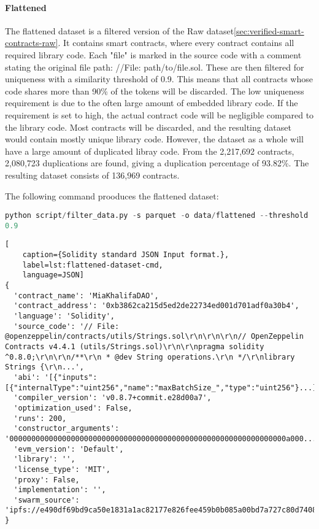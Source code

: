 
\paragraph{Flattened}
\label{sec:verified-smart-contracts-flattened}

The flattened dataset is a filtered version  of the Raw dataset\cref{sec:verified-smart-contracts-raw}. It contains smart contracts, where every contract contains all required library code. Each "file" is marked in the source code with a comment stating the original file path: //File: path/to/file.sol. These are then filtered for uniqueness with a similarity threshold of 0.9. This means that all contracts whose code shares more than 90\% of the tokens will be discarded. The low uniqueness requirement is due to the often large amount of embedded library code. If the requirement is set to high, the actual contract code will be negligible compared to the library code. Most contracts will be discarded, and the resulting dataset would contain mostly unique library code. However, the dataset as a whole will have a large amount of duplicated libray code. From the 2,217,692 contracts, 2,080,723 duplications are found, giving a duplication percentage of 93.82\%. The resulting dataset consists of 136,969 contracts.


The following command prooduces the flattened dataset:

\lstinline[language=Python]!python script/filter_data.py -s parquet -o data/flattened --threshold 0.9!


\begin{lstlisting}[
    caption={Solidity standard JSON Input format.},
    label=lst:flattened-dataset-cmd,
    language=JSON]
{
  'contract_name': 'MiaKhalifaDAO',
  'contract_address': '0xb3862ca215d5ed2de22734ed001d701adf0a30b4',
  'language': 'Solidity',
  'source_code': '// File: @openzeppelin/contracts/utils/Strings.sol\r\n\r\n\r\n// OpenZeppelin Contracts v4.4.1 (utils/Strings.sol)\r\n\r\npragma solidity ^0.8.0;\r\n\r\n/**\r\n * @dev String operations.\r\n */\r\nlibrary Strings {\r\n...',
  'abi': '[{"inputs":[{"internalType":"uint256","name":"maxBatchSize_","type":"uint256"}...]',
  'compiler_version': 'v0.8.7+commit.e28d00a7',
  'optimization_used': False,
  'runs': 200,
  'constructor_arguments': '000000000000000000000000000000000000000000000000000000000000000a000...',
  'evm_version': 'Default',
  'library': '',
  'license_type': 'MIT',
  'proxy': False,
  'implementation': '',
  'swarm_source': 'ipfs://e490df69bd9ca50e1831a1ac82177e826fee459b0b085a00bd7a727c80d74089'
}
\end{lstlisting}

